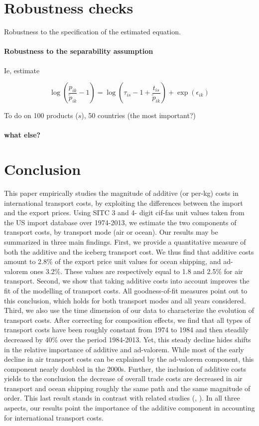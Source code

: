 \documentclass[a4paper,11pt]{article}
\begin{document}
\section{Robustness checks}

Robustness to the specification of the estimated equation.


\paragraph{Robustness to the separability assumption}


Ie, estimate


$$\log(\frac{p_{ik}}{\widetilde{p}_{ik}} -1)= \log(\tau_{is} -1+ \frac{t_{is}}{\widetilde{p}_{ik}})+ \exp(\epsilon_{ik})$$

To do on 100 products ($s$), 50 countries (the most important?)

\paragraph{what else?}

\section{Conclusion \label{sec:conclu}}

This paper empirically studies the magnitude of additive (or per-kg) costs in international transport costs, by exploiting the differences between the import and the export prices. Using SITC 3 and 4- digit cif-fas unit values taken from the US import database over 1974-2013, we estimate the two components of transport costs, by transport mode (air or ocean).  Our results may be summarized in three main findings. First, we provide a quantitative measure of both the additive and the iceberg transport cost. We thus find that additive costs amount to 2.8\% of the export price unit values for ocean shipping, and ad-valorem ones 3.2\%. These values are respectively equal to 1.8 and 2.5\% for air transport. Second, we show that taking additive costs into account improves the fit of the modelling of transport costs. All goodness-of-fit measures point out to this conclusion, which holds for both transport modes and all years considered. Third, we also use the time dimension of our data to characterize the evolution of transport costs. After correcting for composition effects, we find that all types of transport costs have been roughly constant from 1974 to 1984 and then steadily decreased by 40\% over the period 1984-2013. Yet, this steady decline hides shifts in the relative importance of additive and ad-valorem. While most of the early decline in air transport costs can be explained by the ad-valorem component, this component nearly doubled in the 2000s. Further, the inclusion of additive costs yields to the conclusion the decrease of overall trade costs are decreased in air transport and ocean shipping roughly the same path and the same magnitude of order. This last result stands in contrast with related studies (\citealp{hummels2007}, \citealp{Behar_Venables}). In all three aspects, our results point the importance of the additive component in accounting for international transport costs.
\end{document}
